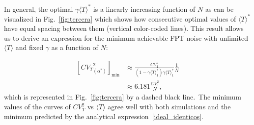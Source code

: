 \documentclass[aps,prb,reprint,superscriptaddress]{revtex4-2}
\begin{document}
In general, the optimal $\gamma \langle T\rangle^*$ is a linearly increasing function of $N$ as can be visualized in Fig.~\ref{fig:tercera} which shows how consecutive optimal values of $\langle T\rangle^*$ have equal spacing between them (vertical color-coded lines). This result allows us to derive an expression for the minimum achievable FPT noise with unlimited $\langle T\rangle$ and fixed $\gamma$ as a function of $N$:

\begin{align}
\label{ideal_identicos}            \left[{CV_T}^2_{(\alpha^*)}\right]_{\min} &\approx \frac{CV^2_{1}}{\left(1-\gamma\langle T\rangle^*_1\right)\gamma\langle T\rangle^*_1}\frac{1}{N}\nonumber\\
&\approx 6.181\frac{CV^2_{1}}{N},
\end{align}
which is represented in Fig.~\ref{fig:tercera} by a dashed black line.~The minimum values of the curves of $CV^2_T$ vs $\langle T\rangle$ agree well with both simulations and the minimum predicted by the analytical expression~\eqref{ideal_identicos}.~




\end{document}
